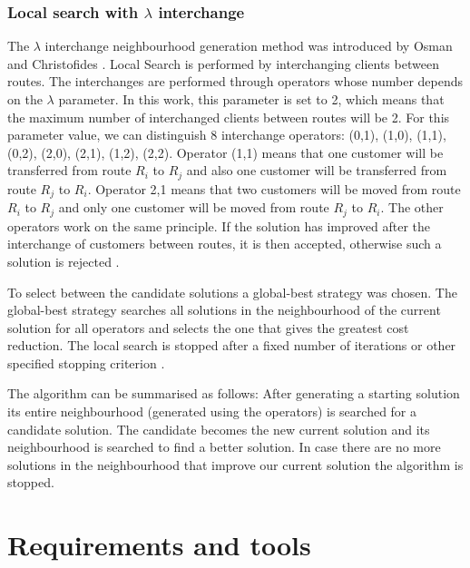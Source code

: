 \documentclass[a4paper,twoside,12pt]{book}
\begin{document}
\subsection{Local search with $\lambda$ interchange}
The $\lambda$ interchange neighbourhood generation method was introduced by Osman and Christofides \cite{bib:article:osman}. Local Search is performed by interchanging clients between routes. The interchanges are performed through operators whose number depends on the $\lambda$ parameter. In this work, this parameter is set to 2, which means that the maximum number of interchanged clients between routes will be 2. For this parameter value, we can distinguish 8 interchange operators: (0,1), (1,0), (1,1), (0,2), (2,0), (2,1), (1,2), (2,2). Operator (1,1) means that one customer will be transferred from route $R_{i}$ to $R_{j}$ and also one customer will be transferred from route $R_{j}$ to $R_{i}$. Operator 2,1 means that two customers will be moved from route $R_{i}$ to $R_{j}$ and only one customer will be moved from route $R_{j}$ to $R_{i}$. The other operators work on the same principle. If the solution has improved after the interchange of customers between routes, it is then accepted, otherwise such a solution is rejected \cite{bib:article:LocalSearchLambda}. 

To select between the candidate solutions a global-best strategy was chosen. The global-best strategy searches all solutions in the neighbourhood of the current solution for all operators and selects the one that gives the greatest cost reduction. The local search is stopped after a fixed number of iterations or other specified stopping criterion \cite{bib:article:LocalSearchLambda}. 

The algorithm can be summarised as follows: After generating a starting solution its entire neighbourhood (generated using the operators) is searched for a candidate solution. The candidate becomes the new current solution and its neighbourhood is searched to find a better solution. In case there are no more solutions in the neighbourhood that improve our current solution the algorithm is stopped.


\chapter{Requirements and tools}
\end{document}

